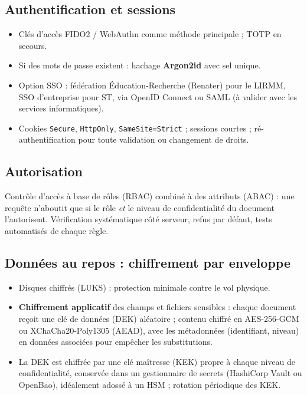 \documentclass[11pt,a4paper]{article}
\begin{document}
\subsection{Authentification et sessions}
\begin{itemize}
  \item Clés d'accès FIDO2 / WebAuthn comme méthode principale ; TOTP en secours.
  \item Si des mots de passe existent : hachage \textbf{Argon2id} avec sel unique.
  \item Option SSO : fédération Éducation-Recherche (Renater) pour le LIRMM, SSO
  d'entreprise pour ST, via OpenID Connect ou SAML (à valider avec les services
  informatiques).
  \item Cookies \texttt{Secure}, \texttt{HttpOnly}, \texttt{SameSite=Strict} ; sessions
  courtes ; ré-authentification pour toute validation ou changement de droits.
\end{itemize}

\subsection{Autorisation}
Contrôle d'accès à base de rôles (RBAC) combiné à des attributs (ABAC) : une requête
n'aboutit que si le rôle \emph{et} le niveau de confidentialité du document
l'autorisent. Vérification systématique côté serveur, refus par défaut, tests
automatisés de chaque règle.

\subsection{Données au repos : chiffrement par enveloppe}
\begin{itemize}
  \item Disques chiffrés (LUKS) : protection minimale contre le vol physique.
  \item \textbf{Chiffrement applicatif} des champs et fichiers sensibles : chaque
  document reçoit une clé de données (DEK) aléatoire ; contenu chiffré en
  AES-256-GCM ou XChaCha20-Poly1305 (AEAD), avec les métadonnées (identifiant,
  niveau) en données associées pour empêcher les substitutions.
  \item La DEK est chiffrée par une clé maîtresse (KEK) propre à chaque niveau de
  confidentialité, conservée dans un gestionnaire de secrets (HashiCorp Vault ou
  OpenBao), idéalement adossé à un HSM ; rotation périodique des KEK.
\end{itemize}
\end{document}
